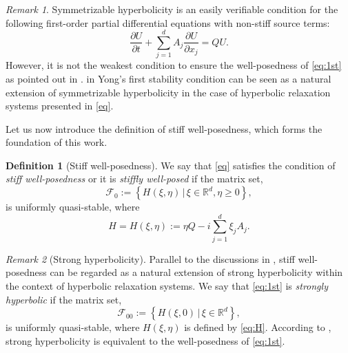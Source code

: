 \documentclass{article}
\theoremstyle{plain}%
\theoremstyle{definition}%
\newtheorem{definition}{Definition}%
\theoremstyle{remark}%
\newtheorem{remark}{Remark}%
\newcommand{\bR}{\mathbb{R}}
\newcommand{\cF}{\mathcal{F}}
\newcommand{\+}[1]{{\bm{#1}}}
\newcommand{\pd}[2]{\dfrac{\partial{#1}}{\partial{#2}}}
\begin{document}
\begin{remark}\label{rmk:relation_yong}
  Symmetrizable hyperbolicity is an easily verifiable condition for 
  the following first-order partial differential equations with 
  non-stiff source terms:
  \begin{equation}\label{eq:1st}
    \pd{U}{t} + \sum_{j = 1}^d A_j \pd{U}{x_j} = Q U.
  \end{equation}
  However, it is not the weakest condition to ensure the 
  well-posedness of \cref{eq:1st} as pointed out in 
  \cite{kreiss_initial-boundary_2004}.
   in Yong's first stability condition 
  can be seen as a natural extension of symmetrizable hyperbolicity 
  in the case of hyperbolic relaxation systems presented in \cref{eq}.
\end{remark}

Let us now introduce the definition of stiff well-posedness,
which forms the foundation of this work.

\begin{definition}[Stiff well-posedness]
  \label{def:stiff_well_posedness}
  We say that \cref{eq} satisfies the condition of 
  \textit{stiff well-posedness} or it is \textit{stiffly well-posed}
  if the matrix set, 
  \begin{displaymath}
    \cF_0 := \left\{ H(\xi, \eta) \,\big|\, \xi \in \bR^d, \eta \ge 0 
    \right\},
  \end{displaymath}
  is uniformly quasi-stable, where 
  \begin{equation}\label{eq:H}
    H = H(\xi, \eta) := \eta Q - i \sum_{j = 1}^d \xi_j A_j.
  \end{equation}
\end{definition}

\begin{remark}[Strong hyperbolicity]
  Parallel to the discussions in , stiff 
  well-posedness can be regarded as a natural extension of 
  strong hyperbolicity \cite{kreiss_initial-boundary_2004} 
  within the context of hyperbolic relaxation systems.
  We say that \cref{eq:1st} is \textit{strongly hyperbolic} if the 
  matrix set, 
  \begin{displaymath}
    \cF_{00} := \left\{ H(\xi, 0) \,\big|\, \xi \in \bR^d \right\},
  \end{displaymath}
  is uniformly quasi-stable, where $H(\xi, \eta)$ is defined by 
  \cref{eq:H}.
  According to \cite{kreiss_initial-boundary_2004}, strong 
  hyperbolicity is equivalent to the well-posedness of \cref{eq:1st}.
\end{remark}
\end{document}
